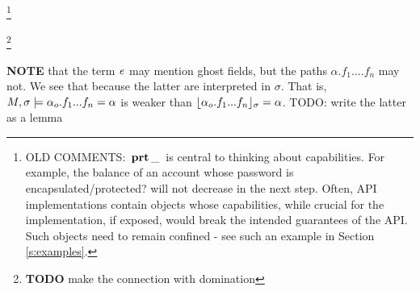 \footnote{
OLD COMMENTS: ${{\, \mathbf{prt}\, \_\, }}$  is central to thinking about capabilities. For example, the balance of an account whose
  password is  encapsulated/protected?  will not decrease in the next step.
  Often, API implementations contain objects whose capabilities, while  crucial for the implementation, if exposed,
would break the intended guarantees of the API. Such objects need to remain confined - see
such an example in Section \ref{s:examples}. 
}

\footnote{{\textbf{TODO} make the connection with domination}}

{\textbf{NOTE}  that the term $\mathit{e}$ may mention ghost fields, but the paths $\alpha.f_1....f_n$ may not. We see that because the latter are interpreted in $\sigma$. That is, $M , \sigma \models {\alpha_o.f_1...f_n}=\alpha$ is weaker than $\lfloor \alpha_{o}.f_1...f_n \rfloor_{\sigma}=\alpha$. TODO: write the latter as a lemma}


 


